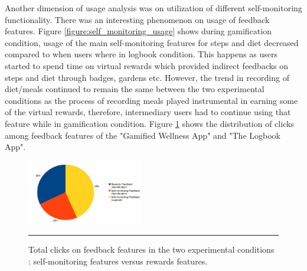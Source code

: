 \documentclass{sig-alternate}
\begin{document}
Another dimension of usage analysis was on utilization of different self-monitoring functionality. There was an interesting phenomenon on usage of feedback features. Figure \ref{figure:self_monitoring_usage} shows during gamification condition, usage of the main self-monitoring features for steps and diet decreased compared to when users where in logbook condition. This happens as users started to spend time on virtual rewards which provided indirect feedbacks on steps and diet through badges, gardens etc. However, the trend in recording of diet/meals continued to remain the same between the two experimental conditions as the process of recording meals played instrumental in earning some of the virtual rewards, therefore, intermediary users had to continue using that feature while in gamification condition. Figure \ref{figure:clicks_distr} shows the distribution of clicks among feedback features of the "Gamified Wellness App" and "The Logbook App".\newline 
\begin{figure}[htbp]
  \centering
    \includegraphics[width=0.45\textwidth]{clicks_distr.png}
    \rule{26em}{0.5pt}
  \caption{Total clicks on feedback features in the two experimental conditions : self-monitoring features versus rewards features.}
  \label{figure:clicks_distr}
\end{figure}\newline
\end{document}
